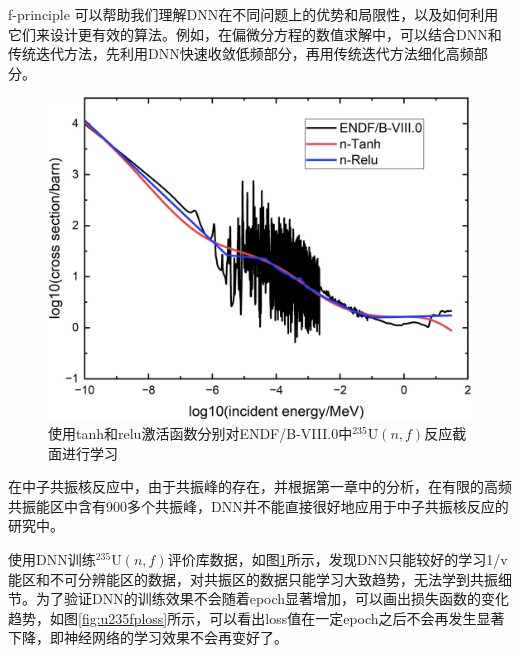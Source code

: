 f-principle 可以帮助我们理解DNN在不同问题上的优势和局限性，以及如何利用它们来设计更有效的算法。例如，在偏微分方程的数值求解中\cite{cai1996adaptive}，可以结合DNN和传统迭代方法，先利用DNN快速收敛低频部分，再用传统迭代方法细化高频部分。
\begin{figure}[htbp!]
    \centering
    \includegraphics[width=0.7\linewidth]{figures/fprinciple/u235fp.jpg}
    \caption{使用tanh和relu激活函数分别对ENDF/B-VIII.0中$^{235}\text{U}(n,f)$反应截面进行学习}
    \label{u235fp}
\end{figure}
在中子共振核反应中，由于共振峰的存在，并根据第一章中的分析，在有限的高频共振能区中含有900多个共振峰，DNN并不能直接很好地应用于中子共振核反应的研究中。

使用DNN训练$^{235}\text{U}(n,f)$评价库数据，如图\ref{u235fp}所示，发现DNN只能较好的学习1/v能区和不可分辨能区的数据，对共振区的数据只能学习大致趋势，无法学到共振细节。为了验证DNN的训练效果不会随着epoch显著增加，可以画出损失函数的变化趋势，如图\ref{fig:u235fploss}所示，可以看出loss值在一定epoch之后不会再发生显著下降，即神经网络的学习效果不会再变好了。

